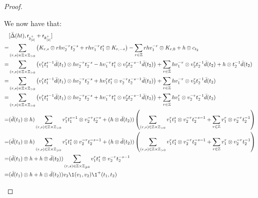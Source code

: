 \begin{proof}
\begin{enumerate}
                    We now have that:
                        $$
                            \begin{aligned}
                                & [\bar{\Delta}(ht), \sfr_{\z_{[2]}^+} + \sfr_{\d_{[2]}^+}]
                                \\
                                = & \sum_{(r, s) \in \Z \x \Z_{> 0}} \left( K_{r, s} \tensor r h v_2^{-r} t_2^{-s} + r h v_1^{-r} t_1^s \tensor K_{r, -s} \right) - \sum_{r \in \Z} r h v_1^{-r} \tensor K_{r, 0} + h \tensor c_{t_2}
                                \\
                                = & \sum_{(r, s) \in \Z \x \Z_{> 0}} \left( v_1^r t_1^{s - 1} \bar{d}(t_1) \tensor h v_2^{-r} t_2^{-s} - h v_1^{-r} t_1^s \tensor v_2^r t_2^{-s - 1} \bar{d}(t_2) \right) + \sum_{r \in \Z} h v_1^{-r} \tensor v_2^r t_2^{-1} \bar{d}(t_2) + h \tensor t_2^{-1} \bar{d}(t_2)
                                \\
                                = & \sum_{(r, s) \in \Z \x \Z_{> 0}} \left( v_1^r t_1^{s - 1} \bar{d}(t_1) \tensor h v_2^{-r} t_2^{-s} + h v_1^r t_1^s \tensor v_2^{-r} t_2^{-s - 1} \bar{d}(t_2) \right) + \sum_{r \in \Z} h v_1^{-r} \tensor v_2^r t_2^{-1} \bar{d}(t_2)
                                \\
                                = & \sum_{(r, s) \in \Z \x \Z_{> 0}} \left( v_1^r t_1^{s - 1} \bar{d}(t_1) \tensor h v_2^{-r} t_2^{-s} + h v_1^{-r} t_1^s \tensor v_2^r t_2^{-s - 1} \bar{d}(t_2) \right) + \sum_{r \in \Z} h v_1^r \tensor v_2^{-r} t_2^{-1} \bar{d}(t_2)
                                \\
                                = & ( \bar{d}(t_1) \tensor h ) \sum_{(r, s) \in \Z \x \Z_{> 0}} v_1^r t_1^{s - 1} \tensor v_2^{-r} t_2^{-s} + ( h \tensor \bar{d}(t_2) ) \left( \sum_{(r, s) \in \Z \x \Z_{> 0}} v_1^r t_1^s \tensor v_2^{-r} t_2^{-s - 1} + \sum_{r \in \Z} v_1^r \tensor v_2^{-r} t_2^{-1} \right)
                                \\
                                = & ( \bar{d}(t_1) \tensor h ) \sum_{(r, s) \in \Z \x \Z_{\geq 0}} v_1^r t_1^s \tensor v_2^{-r} t_2^{-s - 1} + ( h \tensor \bar{d}(t_2) ) \left( \sum_{(r, s) \in \Z \x \Z_{> 0}} v_1^r t_1^s \tensor v_2^{-r} t_2^{-s - 1} + \sum_{r \in \Z} v_1^r \tensor v_2^{-r} t_2^{-1} \right)
                                \\
                                = & ( \bar{d}(t_1) \tensor h + h \tensor \bar{d}(t_2) ) \sum_{(r, s) \in \Z \x \Z_{\geq 0}} v_1^r t_1^s \tensor v_2^{-r} t_2^{-s - 1}
                                \\
                                = & ( \bar{d}(t_1) \tensor h + h \tensor \bar{d}(t_2) ) v_2 \1(v_1, v_2) \1^+(t_1, t_2)
                            \end{aligned}
                        $$


\end{enumerate}
\end{proof}
